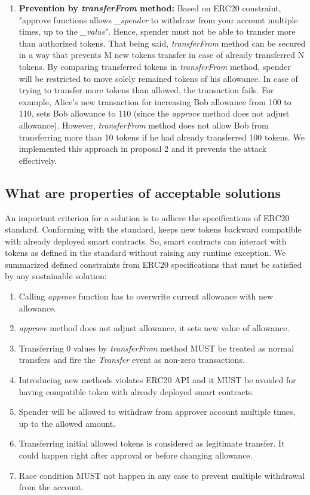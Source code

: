 \begin{enumerate}
	\item \textbf{Prevention by \textit{transferFrom} method:} Based on ERC20 constraint, "approve functions allows \textit{\_spender} to withdraw from your account multiple times, up to the \textit{\_value}". Hence, spender must not be able to transfer more than authorized tokens. That being said, \textit{transferFrom} method can be secured in a way that prevents M new tokens transfer in case of already transferred N tokens. By comparing transferred tokens in \textit{transferFrom} method, spender will be restricted to move solely remained tokens of his allowance. In case of trying to transfer more tokens than allowed, the transaction fails. For example, Alice's new transaction for increasing Bob allowance from 100 to 110, sets Bob allowance to 110 (since the \textit{approve} method does not adjust allowance). However, \textit{transferFrom} method does not allow Bob from transferring more than 10 tokens if he had already transferred 100 tokens. We implemented this approach in proposal 2 and it prevents the attack effectively.
\end{enumerate}

\subsection{What are properties of acceptable solutions}
An important criterion for a solution is to adhere the specifications of ERC20 standard. Conforming with the standard, keeps new tokens backward compatible with already deployed smart contracts. So, smart contracts can interact with tokens as defined in the standard without raising any runtime exception. We summarized defined constraints from ERC20 specifications \cite{Ref08} that must be satisfied by any sustainable solution:
\begin{enumerate}
	\item Calling \textit{approve} function has to overwrite current allowance with new allowance.
	\item \textit{approve} method does not adjust allowance, it sets new value of allowance.
	\item Transferring 0 values by \textit{transferFrom} method MUST be treated as normal transfers and fire the \textit{Transfer} event as non-zero transactions.
	\item Introducing new methods violates ERC20 API and it MUST be avoided for having compatible token with already deployed smart contracts.
	\item Spender will be allowed to withdraw from approver account multiple times, up to the allowed amount.
	\item Transferring initial allowed tokens is considered as legitimate transfer. It could happen right after approval or before changing allowance.
	\item Race condition MUST not happen in any case to prevent multiple withdrawal from the account.\newline
\end{enumerate}